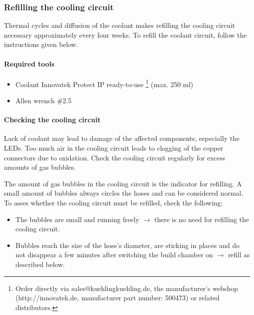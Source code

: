 \subsubsection{Refilling the cooling circuit} \label{sec:coolant}

Thermal cycles and diffusion of the coolant makes refilling the cooling circuit necessary approximately every four weeks. To refill the coolant circuit, follow the instructions given below. 

\paragraph{Required tools}

\begin{itemize}
  \item Coolant Innovatek Protect IP ready-to-use \footnote{Order directly via sales@kuehlingkuehling.de, 
        the manufacturer's webshop (http://innovatek.de, manufacturer part number: 500473) or related distributors.} 
        (max. 250 ml)
  \item Allen wrench \#2.5
\end{itemize}

\paragraph{Checking the cooling circuit}

\begin{info}
  Lack of coolant may lead to damage of the affected components, especially the LEDs. Too much air in the cooling circuit leads to clogging of the copper connectors due to oxidation.
  Check the cooling circuit regularly for excess amounts of gas bubbles.
\end{info}

The amount of gas bubbles in the cooling circuit is the indicator for refilling. A small amount of bubbles always circles the hoses and can be considered normal. To asses whether the cooling circuit must be refilled, check the following:

\begin{itemize}
  \item The bubbles are small and running freely $\rightarrow$ there is no need for refilling the cooling circuit.
  \item Bubbles reach the size of the hose's diameter, are sticking in places and do not disappear 
        a few minutes after switching the build chamber on $\rightarrow$ refill as described below.
\end{itemize}

